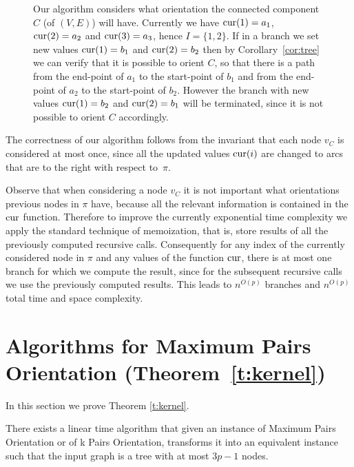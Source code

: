 \documentclass[envcountsame]{llncs}
\begin{document}
\begin{figure} 
\centering 
\epsfysize=3.1cm
   \caption{Our algorithm considers what orientation the connected component $C$ (of $(V,E)$)
will have. Currently we have ${\rm cur}(1)=a_1$, ${\rm cur}(2)=a_2$ and ${\rm cur}(3)=a_3$, hence $I=\{1,2\}$.
If in a branch we set new values ${\rm cur}(1)=b_1$ and ${\rm cur}(2)=b_2$ then by Corollary~\ref{cor:tree} we can
verify that it is possible to orient $C$, so that there is a path from the end-point 
of $a_1$ to the start-point of $b_1$ and from the end-point of $a_2$ to the start-point of $b_2$.
However the branch with new values ${\rm cur}(1)=b_2$ and ${\rm cur}(2)=b_1$ will be terminated,
since it is not possible to orient $C$ accordingly.}
\label{fig:zoom}
\end{figure}

The correctness of our algorithm follows from the invariant that each node $v_C$ is considered
at most once, since all the updated values ${\rm cur}(i)$ are changed to arcs that are
to the right with respect to~$\pi$.

Observe that when considering a node $v_C$ it is not important what orientations previous nodes in $\pi$ have,
because all the relevant information is contained in the ${\rm cur}$ function. 
Therefore to improve the currently exponential time complexity we apply the standard technique of 
memoization, that is, store results of all the previously computed recursive calls.
Consequently for any index of the currently considered node in $\pi$ 
and any values of the function ${\rm cur}$, there is at most one branch
for which we compute the result, since for the subsequent recursive calls
we use the previously computed results.
This leads to $n^{O(p)}$ branches and $n^{O(p)}$ total time and space complexity.

\section{Algorithms for {\sf Maximum Pairs Orientation} (Theorem~\ref{t:kernel})} \label{s:kernel}

In this section we prove Theorem \ref{t:kernel}.

\begin{lemma}
\label{lem:kernel}
There exists a linear time algorithm that given an instance 
of {\sf Maximum Pairs Orientation} or of {\sf k Pairs Orientation},
transforms it into an equivalent instance such that the input graph is a tree
with at most $3p-1$ nodes.
\end{lemma}
\end{document}
